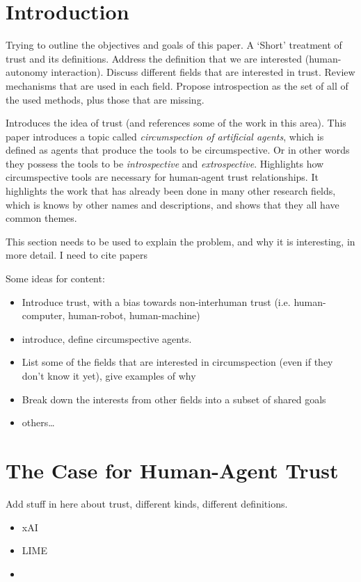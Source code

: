 \section{Introduction}
    Trying to outline the objectives and goals of this paper. A `Short' treatment of trust and its definitions. Address the definition that we are interested (human-autonomy interaction). Discuss different fields that are interested in trust. Review mechanisms that are used in each field. Propose introspection as the set of all of the used methods, plus those that are missing.
    
    Introduces the idea of trust (and references some of the work in this area). This paper introduces a topic called \emph{circumspection of artificial agents}, which is defined as agents that produce the tools to be circumspective. Or in other words they possess the tools to be \emph{introspective} and \emph{extrospective}. Highlights how circumspective tools are necessary for human-agent trust relationships. It highlights the work that has already been done in many other research fields, which is knows by other names and descriptions, and shows that they all have common themes.

    This section needs to be used to explain the problem, and why it is interesting, in more detail. I need to cite papers

    Some ideas for content:

    \begin{itemize}
        \item Introduce trust, with a bias towards non-interhuman trust (i.e. human-computer, human-robot, human-machine)
        \item introduce, define circumspective agents.
        \item List some of the fields that are interested in circumspection (even if they don't know it yet), give examples of why
        \item Break down the interests from other fields into a subset of shared goals
        \item others\ldots
    \end{itemize}

\section{The Case for Human-Agent Trust}
    Add stuff in here about trust, different kinds, different definitions.

    \begin{itemize}
        \item xAI
        \item LIME
        \item 
    \end{itemize}

